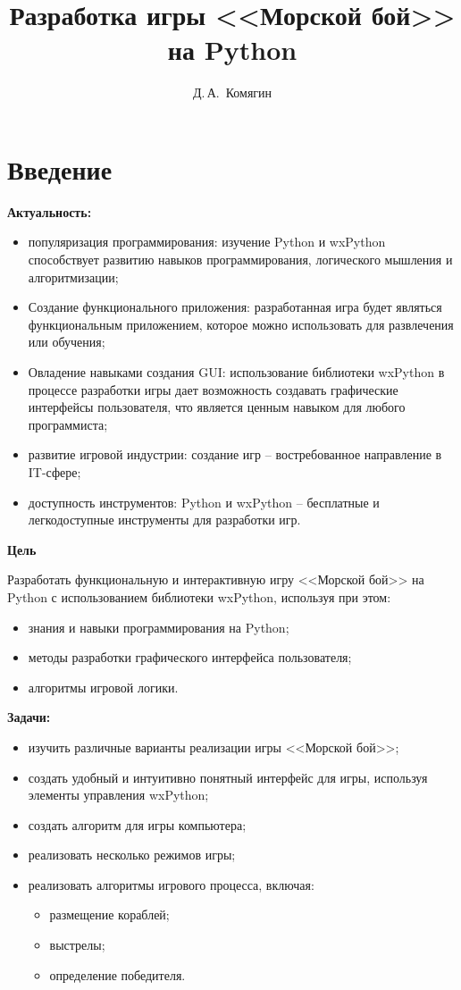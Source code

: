 \documentclass[14pt, oneside]{altsu-report}
\title{Разработка игры <<Морской бой>> на Python}
\author{Д.\,А.~Комягин}
\institute{Институт цифровых технологий, электроники и физики}
\date{\the\year}
\begin{document}
\maketitle

\setcounter{page}{2}
\makeabstract
\tableofcontents

\chapter*{Введение}

\textbf{Актуальность:}
\begin{itemize}
\item популяризация программирования: изучение Python и wxPython способствует развитию навыков программирования, логического мышления и алгоритмизации;
\item Создание функционального приложения: разработанная игра будет являться функциональным приложением, которое можно использовать для развлечения или обучения;
\item Овладение навыками создания GUI: использование библиотеки wxPython в процессе разработки игры дает возможность создавать графические интерфейсы пользователя, что является ценным навыком для любого программиста;
\item развитие игровой индустрии: создание игр – востребованное направление в IT-сфере;
\item доступность инструментов: Python и wxPython – бесплатные и легкодоступные инструменты для разработки игр.
\end{itemize}

\textbf{Цель}

Разработать функциональную и интерактивную игру <<Морской бой>> на Python с использованием библиотеки wxPython, используя при этом:
\begin{itemize}
\item знания и навыки программирования на Python;
\item методы разработки графического интерфейса пользователя;
\item алгоритмы игровой логики.
\end{itemize}

\textbf{Задачи:}

\begin{itemize}
\item изучить различные варианты реализации игры <<Морской бой>>;
\item создать удобный и интуитивно понятный интерфейс для игры, используя элементы управления wxPython;
\item создать алгоритм для игры компьютера;
\item реализовать несколько режимов игры;
\item реализовать алгоритмы игрового процесса, включая:
\begin{itemize}
    \item размещение кораблей;
    \item выстрелы;
    \item определение победителя.
\end{itemize}
\end{itemize}
\end{document}
